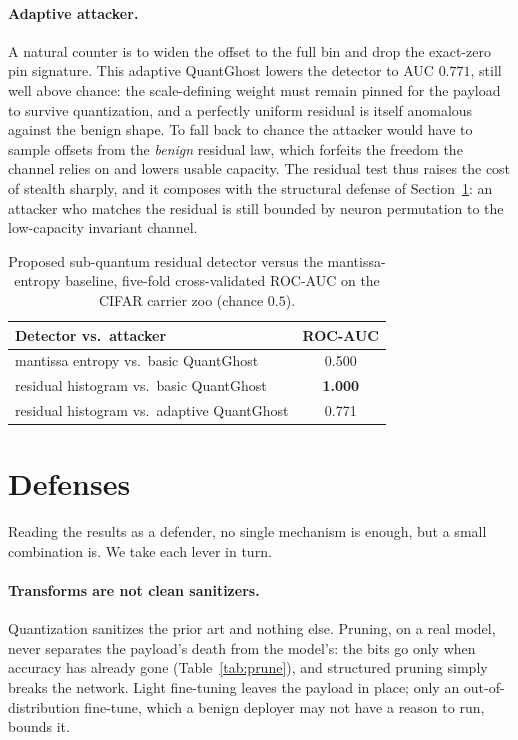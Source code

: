 \documentclass[a4paper,fleqn]{cas-dc}
\theoremstyle{plain}
\theoremstyle{remark}
\newcommand{\sys}{\mbox{QuantGhost}}
\begin{document}
\paragraph{Adaptive attacker.} A natural counter is to widen the offset to the full bin
and drop the exact-zero pin signature. This adaptive \sys{} lowers the detector to
AUC $0.771$, still well above chance: the scale-defining weight must remain pinned for the
payload to survive quantization, and a perfectly uniform residual is itself anomalous
against the benign shape. To fall back to chance the attacker would have to sample
offsets from the \emph{benign} residual law, which forfeits the freedom the channel
relies on and lowers usable capacity. The residual test thus raises the cost of stealth
sharply, and it composes with the structural defense of Section~\ref{sec:defenses}: an
attacker who matches the residual is still bounded by neuron permutation to the
low-capacity invariant channel.

\begin{table}[t]\centering
\caption{Proposed sub-quantum residual detector versus the mantissa-entropy baseline,
five-fold cross-validated ROC-AUC on the CIFAR carrier zoo (chance $0.5$).}
\label{tab:detector}
\begin{tabular*}{\columnwidth}{@{\extracolsep{\fill}}lc@{}}
\toprule
Detector vs.\ attacker & ROC-AUC\\
\midrule
mantissa entropy vs.\ basic \sys{} & 0.500\\
residual histogram vs.\ basic \sys{} & \textbf{1.000}\\
residual histogram vs.\ adaptive \sys{} & 0.771\\
\bottomrule
\end{tabular*}
\end{table}

\section{Defenses}\label{sec:defenses}
Reading the results as a defender, no single mechanism is enough, but a small
combination is. We take each lever in turn.

\paragraph{Transforms are not clean sanitizers.} Quantization sanitizes the prior art
and nothing else. Pruning, on a real model, never separates the payload's death from
the model's: the bits go only when accuracy has already gone (Table~\ref{tab:prune}),
and structured pruning simply breaks the network. Light fine-tuning leaves the payload
in place; only an out-of-distribution fine-tune, which a benign deployer may not have a
reason to run, bounds it.
\end{document}
